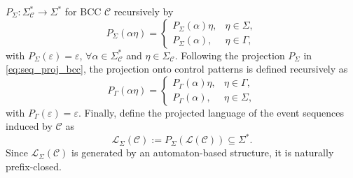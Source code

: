 \documentclass[journal,twoside,web]{ieeecolor}
\begin{document}
$
    P_\Sigma: \Sigma_{\mathcal{C}}^* \to \Sigma^*
$
for BCC $\mathcal{C}$ recursively by
\begin{equation}\label{eq:seq_proj_bcc}
P_\Sigma(\alpha \eta)
=
\begin{cases}
    P_\Sigma(\alpha) \eta, & \eta \in \Sigma,\\
    P_\Sigma(\alpha),      & \eta \in \Gamma,
\end{cases}
\end{equation}
with $P_\Sigma(\varepsilon)=\varepsilon$,
$\forall \alpha \in \Sigma_{\mathcal{C}}^*$ and $\eta \in \Sigma_{\mathcal{C}}$.
Following the projection $P_{\Sigma}$ in \eqref{eq:seq_proj_bcc}, the projection onto control patterns is defined recursively as
\begin{equation}\label{eq:proj_bcc_ctrl}
P_\Gamma(\alpha \eta) =
\begin{cases}
P_\Gamma(\alpha) \eta, & \eta \in \Gamma,\\
P_\Gamma(\alpha), & \eta \in \Sigma,
\end{cases}
\end{equation}
%
with $P_\Gamma(\varepsilon)=\varepsilon$.
Finally, define the projected language of the event sequences induced by $\mathcal{C}$ as
\begin{equation}
    \mathcal{L}_{\Sigma}(\mathcal{C})
    :=
    P_\Sigma(\mathcal{L}(\mathcal{C}))
    \subseteq \Sigma^* .
    \label{eq:proj_lang_bcc}
\end{equation}
Since $\mathcal{L}_{\Sigma}(\mathcal{C})$ is generated by an automaton-based structure, it is naturally prefix-closed.
\end{document}
